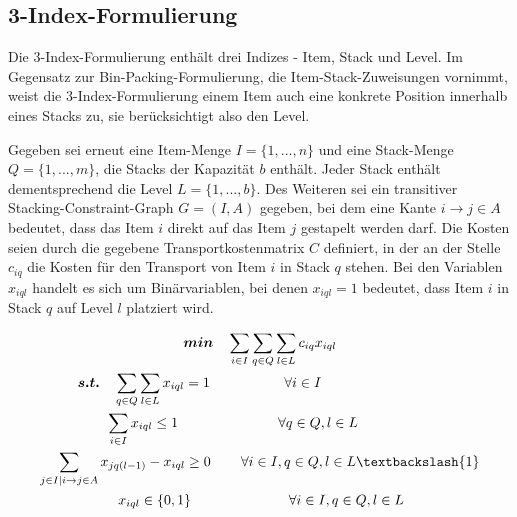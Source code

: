 \subsection{3-Index-Formulierung}
\label{sec:three_idx_formulation}

Die 3-Index-Formulierung enthält drei Indizes - Item, Stack und Level.
Im Gegensatz zur Bin-Packing-Formulierung, die Item-Stack-Zuweisungen vornimmt, weist die 3-Index-Formulierung einem
Item auch eine konkrete Position innerhalb eines Stacks zu, sie berücksichtigt also den Level.

Gegeben sei erneut eine Item-Menge $I = \{1, ..., n\}$ und eine Stack-Menge $Q = \{1, ..., m\}$, die Stacks der Kapazität $b$ enthält.
Jeder Stack enthält dementsprechend die Level $L = \{1, ..., b\}$. Des Weiteren sei ein transitiver Stacking-Constraint-Graph
$G = (I, A)$ gegeben, bei dem eine Kante $i \rightarrow j \in A$ bedeutet, dass das Item $i$ direkt auf das Item $j$ gestapelt werden darf.
Die Kosten seien durch die gegebene Transportkostenmatrix $C$ definiert, in der an der Stelle $c_{iq}$ die Kosten für den
Transport von Item $i$ in Stack $q$ stehen. Bei den Variablen $x_{iql}$ handelt es sich um Binärvariablen,
bei denen $x_{iql} = 1$ bedeutet, dass Item $i$ in Stack $q$ auf Level $l$ platziert wird.

\begin{gather}
\boldsymbol{min} \quad \sum_{i \in I} \sum_{q \in Q} \sum_{l \in L} c_{iq} x_{iql} \label{three_idx_line_one} \\
\boldsymbol{s.t.} \quad \sum_{q \in Q} \sum_{l \in L} x_{iql} = 1 \quad\thinspace\thinspace\quad\quad\quad\quad \forall i \in I \thinspace\thinspace\quad\quad\quad\quad\quad\quad\quad\quad\thinspace\thinspace \label{three_idx_line_two} \\
\sum_{i \in I} x_{iql} \leq 1 \thinspace\quad\quad\quad\quad\quad\quad\quad \forall q \in Q, l \in L \thinspace\thinspace\thinspace\thinspace\quad\quad\quad\thinspace \label{three_idx_line_three} \\
\sum_{j \in I | i \rightarrow j \in A} x_{jq(l-1)} - x_{iql} \geq 0 \thinspace\quad\quad \forall i \in I, q \in Q, l \in L \textbackslash \{1\}
\label{three_idx_line_four} \\
\quad\quad x_{iql} \in \{0, 1\} \quad\quad\quad\quad\quad\quad\quad \forall i \in I, q \in Q, l \in L \quad\thinspace\thinspace\thinspace\thinspace\thinspace \label{three_idx_line_five}
\end{gather}

